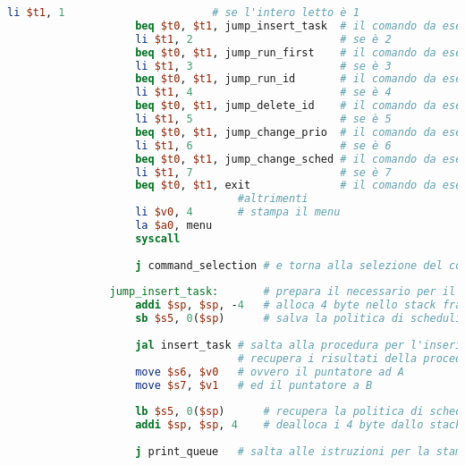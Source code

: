 \begin{center}
\begin{lstlisting}[language=mips, gobble=14, stepnumber=1]
                    li $t1, 1                       # se l'intero letto è 1
                    beq $t0, $t1, jump_insert_task  # il comando da eseguire è l'inserimento di un nuovo task
                    li $t1, 2                       # se è 2
                    beq $t0, $t1, jump_run_first    # il comando da eseguire è l'esecuzione del primo task
                    li $t1, 3                       # se è 3
                    beq $t0, $t1, jump_run_id       # il comando da eseguire è l'esecuzione di un task specifico
                    li $t1, 4                       # se è 4
                    beq $t0, $t1, jump_delete_id    # il comando da eseguire è l'eminazione di un task specifico
                    li $t1, 5                       # se è 5
                    beq $t0, $t1, jump_change_prio  # il comando da eseguire è la modifica della priorità di un task specifico
                    li $t1, 6                       # se è 6
                    beq $t0, $t1, jump_change_sched # il comando da eseguire è il cambio della politica di scheduling
                    li $t1, 7                       # se è 7
                    beq $t0, $t1, exit              # il comando da eseguire è la terminazione del programma
                                    #altrimenti
                    li $v0, 4       # stampa il menu
                    la $a0, menu
                    syscall
                    
                    j command_selection # e torna alla selezione del comando
                    
                jump_insert_task:       # prepara il necessario per il salto al comando d'inserimento
                    addi $sp, $sp, -4   # alloca 4 byte nello stack frame
                    sb $s5, 0($sp)      # salva la politica di scheduling nello stack
                    
                    jal insert_task # salta alla procedura per l'inserimento di un task
                                    # recupera i risultati della procedura
                    move $s6, $v0   # ovvero il puntatore ad A
                    move $s7, $v1   # ed il puntatore a B
                    
                    lb $s5, 0($sp)      # recupera la politica di scheduling dallo stack
                    addi $sp, $sp, 4    # dealloca i 4 byte dallo stack
                    
                    j print_queue   # salta alle istruzioni per la stampa della coda
                    

\end{lstlisting}
\end{center}
